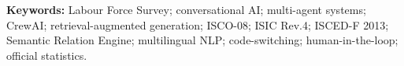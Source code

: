 \documentclass[12pt,a4paper]{report}
\theoremstyle{plain}
\theoremstyle{definition}
\theoremstyle{remark}
\begin{document}
\vspace{6pt}
\noindent\textbf{Keywords:} Labour Force Survey; conversational AI;
multi-agent systems; CrewAI; retrieval-augmented generation; ISCO-08;
ISIC Rev.4; ISCED-F 2013; Semantic Relation Engine; multilingual NLP;
code-switching; human-in-the-loop; official statistics.

\clearpage


\tableofcontents
\clearpage
\listoffigures
\listoftables


\newpage

\setcounter{page}{1}




















\end{document}
